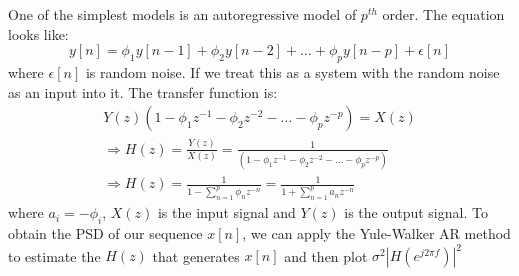 \documentclass{article}
\begin{document}
One of the simplest models is an autoregressive model of $p^{th}$ order. The equation looks like:
\begin{equation}
  y[n]=\phi_1 y[n-1]+\phi_2 y[n-2]+\ldots+\phi_p y[n-p]+\epsilon[n]
\end{equation}
where $\epsilon[n]$ is random noise. If we treat this as a system with the random noise as an input into it. The transfer function is:
\begin{align}
  Y(z)(1-\phi_1 z^{-1}-\phi_2 z^{-2}-\ldots-\phi_p z^{-p})=X(z)\\
  \Rightarrow H(z)=\frac{Y(z)}{X(z)}=\frac{1}{(1-\phi_1 z^{-1}-\phi_2 z^{-2}-\ldots-\phi_p z^{-p})}\\
  \Rightarrow H(z)=\frac{1}{1-\sum_{n=1}^{p}\phi_n z^{-n}}=\frac{1}{1+\sum_{n=1}^{p}a_n z^{-n}}
\end{align}
where $a_i=-\phi_i$, $X(z)$ is the input signal and $Y(z)$ is the output signal. To obtain the PSD of our sequence $x[n]$, we can apply the Yule-Walker AR method to estimate the $H(z)$ that generates $x[n]$ and then plot $\sigma^2 |H(e^{j2\pi f})|^2$
\end{document}
